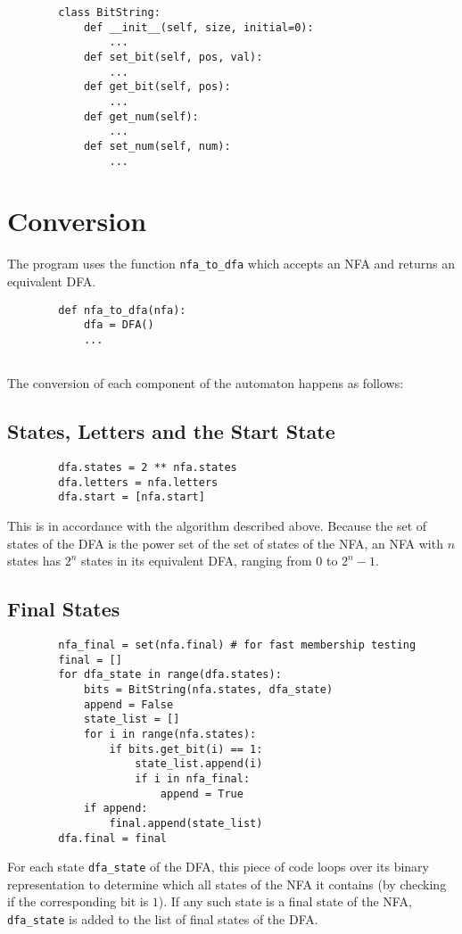 \documentclass[12pt]{scrreprt}
\begin{document}
    \begin{verbatim}
        class BitString:
            def __init__(self, size, initial=0):
                ...
            def set_bit(self, pos, val):
                ...
            def get_bit(self, pos):
                ...
            def get_num(self):
                ...
            def set_num(self, num):
                ...
    \end{verbatim}

    \section{Conversion}

    The program uses the function \texttt{nfa_to_dfa} which accepts an NFA and returns an equivalent DFA.

    \begin{verbatim}
        def nfa_to_dfa(nfa):
            dfa = DFA()
            ...
        
    \end{verbatim}

    The conversion of each component of the automaton happens as follows:

    \subsection*{States, Letters and the Start State}

    \begin{verbatim}
        dfa.states = 2 ** nfa.states
        dfa.letters = nfa.letters
        dfa.start = [nfa.start]
    \end{verbatim}
    This is in accordance with the algorithm described above. Because the set of states of the DFA is the power set of the set of states of the NFA, an NFA with $ n $ states has $ 2^n $ states in its equivalent DFA, ranging from $ 0 $ to $ 2^n - 1 $.

    \subsection*{Final States}

    \begin{verbatim}
        nfa_final = set(nfa.final) # for fast membership testing
        final = []
        for dfa_state in range(dfa.states):
            bits = BitString(nfa.states, dfa_state)
            append = False
            state_list = []
            for i in range(nfa.states):
                if bits.get_bit(i) == 1:
                    state_list.append(i)
                    if i in nfa_final:
                        append = True
            if append:
                final.append(state_list)
        dfa.final = final
    \end{verbatim}
    For each state \texttt{dfa_state} of the DFA, this piece of code loops over its binary representation to determine which all states of the NFA it contains (by checking if the corresponding bit is $1$). If any such state is a final state of the NFA, \texttt{dfa_state} is added to the list of final states of the DFA.
\end{document}
